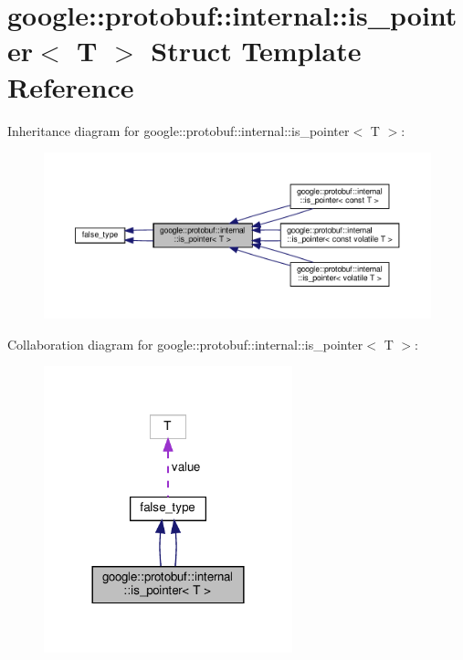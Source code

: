 \hypertarget{structgoogle_1_1protobuf_1_1internal_1_1is__pointer}{}\section{google\+:\+:protobuf\+:\+:internal\+:\+:is\+\_\+pointer$<$ T $>$ Struct Template Reference}
\label{structgoogle_1_1protobuf_1_1internal_1_1is__pointer}


Inheritance diagram for google\+:\+:protobuf\+:\+:internal\+:\+:is\+\_\+pointer$<$ T $>$\+:
\nopagebreak
\begin{figure}[H]
\begin{center}
\leavevmode
\includegraphics[width=350pt]{structgoogle_1_1protobuf_1_1internal_1_1is__pointer__inherit__graph}
\end{center}
\end{figure}


Collaboration diagram for google\+:\+:protobuf\+:\+:internal\+:\+:is\+\_\+pointer$<$ T $>$\+:
\nopagebreak
\begin{figure}[H]
\begin{center}
\leavevmode
\includegraphics[width=204pt]{structgoogle_1_1protobuf_1_1internal_1_1is__pointer__coll__graph}
\end{center}
\end{figure}
